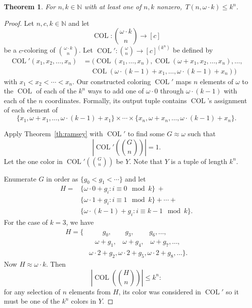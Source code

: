 \documentclass[11pt]{article}
\newcommand{\om}{\omega}
\newcommand{\oequiv}{\approx}
\newcommand{\setconcat}{+}
\newcommand{\COL}{\operatorname{COL}}
\newcommand{\N}{\mathbb{N}}
\newcommand{\numpoints}{n}
\newcommand{\numcolors}{c}
\theoremstyle{plain}
\newtheorem{theorem}{Theorem}[section]
\theoremstyle{definition}
\begin{document}
\begin{theorem}\label{th:omka-lt}
For $\numpoints,k \in \N$ with at least one of $\numpoints,k$ nonzero,~$T(\numpoints,\om \cdot k) \leq k^{\numpoints}$.
\end{theorem}
\begin{proof}
Let $\numpoints,\numcolors, k  \in \N$ and let 
$$\COL \colon \binom{\om \cdot k}{\numpoints} \to [\numcolors]$$
be a $\numcolors$-coloring of $\binom{\om \cdot k}{\numpoints}$.
Let $\COL' \colon \binom{\om}{\numpoints} \to [\numcolors]^{(k^{\numpoints})}$ 
be defined by
\begin{align*}\COL'(x_1,x_2,\ldots,x_{\numpoints}) & = (\COL(x_1,\ldots,x_{\numpoints}), \COL(\om + x_1,x_2,\ldots,x_{\numpoints}), \ldots, \\&~~~~~\COL(\om \cdot (k-1) + x_1, \ldots, \om \cdot (k-1) + x_{\numpoints}))\end{align*}
with $x_1 < x_2 < \cdots < x_{\numpoints}.$ Our constructed coloring 
$\COL'$ maps $\numpoints$ elements of $\om$ to the $\COL$ of each of the $k^{\numpoints}$ ways to add one of $\om\cdot 0$ through $\om \cdot (k-1)$ with each of the $\numpoints$ coordinates. 
Formally, its output tuple contains $\COL$'s assignment of each element of $$
\{x_1,\om+x_1,\ldots,\om\cdot(k-1)+x_1\}\times\cdots\times
\{x_{\numpoints},\om+x_\numpoints,\ldots,\om\cdot(k-1)+x_\numpoints\}.
$$

Apply Theorem~\ref{th:ramsey} with $\COL'$ to find some $G\oequiv \om$ such that 
$$
\left |\COL'\left(\binom{G}{\numpoints}\right)\right|=1.
$$ 
Let the one color in $\COL'\left(\binom{G}{\numpoints}\right)$ be $Y$. 
Note that $Y$ is a tuple of length $k^{\numpoints}$. 

Enumerate $G$ in order as $\{g_0 < g_1 < \cdots\}$ and let \begin{align*}
H = & \{\om \cdot 0 + g_i \colon i \equiv 0 \mod k\}~\!\setconcat\\
 & \{\om \cdot 1 + g_i \colon i\equiv 1 \mod k \} \setconcat \cdots \setconcat  \\
& \{\om \cdot (k-1) + g_i \colon i \equiv k-1 \mod k\}.
\end{align*} For the case of $k=3$, we have \begin{align*}
    H = \{ & ~~~~~~~~~g_0, ~~~~~~~~~g_3, ~~~~~~~~~~g_6, \ldots,\\
    & ~~~~\!\om + g_1, ~~~~\!\om + g_4, ~~~~\om + g_7, \ldots,\\
    & \om \cdot 2 + g_2, \om \cdot 2 + g_5, \om \cdot 2 + g_8,\ldots\}.
\end{align*} Now $H \oequiv \om \cdot k$. Then
$$
\left |\COL\left(\binom{H}{\numpoints}\right)\right |\leq k^{\numpoints}:
$$ 
for any selection of $\numpoints$ elements from $H$, its color was considered in $\COL'$ so it must be one of the $k^{\numpoints}$ colors in $Y$.
\end{proof}
\end{document}

